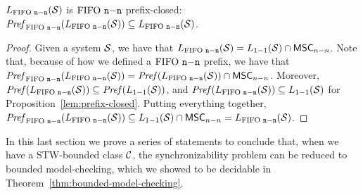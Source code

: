 \begin{proposition}\label{lem:nn-prefix-closed}
	$\nnL{\Sys}$ is $\nn$ prefix-closed:
	$\Prefnn{\nnL{\Sys}} \subseteq \nnL{\Sys}$.
\end{proposition}
\begin{proof}
	Given a system $\System$, we have that $\nnL{\System} = \ppL{\System} \cap \nnMSCs$. Note that, because of how we defined a $\nn$ prefix, we have that $\Prefnn{\nnL{\Sys}} = \Pref{\nnL{\Sys}} \cap \nnMSCs$. Moreover, $\Pref{\nnL{\Sys}} \subseteq \Pref{\ppL{\Sys}}$, and $\Pref{\nnL{\Sys}} \subseteq \ppL{\Sys}$ for Proposition~\ref{lem:prefix-closed}. Putting everything together, $\Prefnn{\nnL{\Sys}} \subseteq \ppL{\Sys} \cap \nnMSCs = \nnL{\System}$.
\end{proof}

In this last section we prove a series of statements to conclude that, when we have a STW-bounded class $\Class$, the synchronizability problem can be reduced to bounded model-checking, which we showed to be decidable in Theorem~\ref{thm:bounded-model-checking}.

